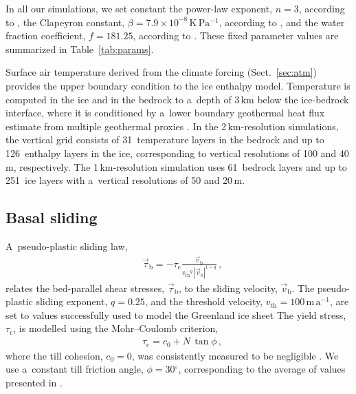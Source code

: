 \documentclass{article}
\newcommand{\unit}[1]{\ensuremath{\mathrm{#1}}}
\newcommand{\degree}[0]{\ensuremath{^{\circ}}}
\begin{document}
    In all our simulations, we set constant the power-law exponent, $n=3$,
    according to \citet[p.~55--57]{Cuffey.Paterson.2010}, the Clapeyron
    constant, $\beta=7.9\times 10^{-8}$\,\unit{K\,Pa^{-1}}, according to
    \citet{Luthi.etal.2002}, and the water fraction coefficient, $f=181.25$,
    according to \citet{Lliboutry.Duval.1985}. These fixed parameter values are
    summarized in Table~\ref{tab:params}.

    Surface air temperature derived from the climate forcing
    (Sect.~\ref{sec:atm}) provides the upper boundary condition to the ice
    enthalpy model. Temperature is computed in the ice and in the bedrock to
    a~depth of 3\,\unit{km} below the ice-bedrock interface, where it is
    conditioned by a~lower boundary geothermal heat flux estimate from multiple
    geothermal proxies \citep[similarity method]{Goutorbe.etal.2011}. In the
    2\,km-resolution simulations, the vertical grid consists of 31~temperature
    layers in the bedrock and up to 126~enthalpy layers in the ice,
    corresponding to vertical resolutions of 100 and 40\,\unit{m},
    respectively. The 1\,km-resolution simulation uses 61~bedrock layers and up
    to 251~ice layers with a~vertical resolutions of 50 and 20\,\unit{m}.

\subsection{Basal sliding}
\label{sec:sliding}

    A~pseudo-plastic sliding law,
%
\begin{align}
&\label{eqn:pseudoplastic}
    \vec{\tau}_{\mathrm{b}} = -\tau_{\mathrm{c}} \frac{\vec{v}_{\mathrm{b}}}{{v_{\text{th}}}^q\,|\vec{v}_{\mathrm{b}}|^{1-q}} \,,
\end{align}
%
    relates the bed-parallel shear stresses, $\vec{\tau}_{\mathrm{b}}$, to the
    sliding velocity, $\vec{v}_{\mathrm{b}}$. The pseudo-plastic sliding
    exponent, $q=0.25$, and the threshold velocity,
    $v_{\text{th}}=100$\,\unit{m\,a^{-1}}, are set to values successfully used
    to model the Greenland ice sheet \citet{Aschwanden.etal.2013} The yield
    stress, $\tau_{\mathrm{c}}$, is modelled using the Mohr--Coulomb criterion,
%
\begin{align}
&\tau_{\mathrm{c}} = c_0 + N\,\tan{\phi} \,,
\end{align}
%
    where the till cohesion, $c_0=0$, was consistently measured to be
    negligible \citep[p.~268]{Tulaczyk.etal.2000, Cuffey.Paterson.2010}. We use
    a~constant till friction angle, $\phi=30$\unit{\degree}, corresponding to
    the average of values presented in \citet[p.~268]{Cuffey.Paterson.2010}.
\end{document}
